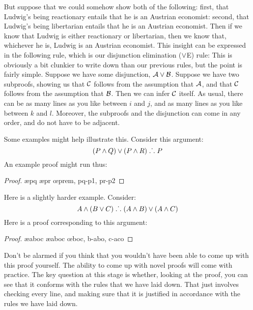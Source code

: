 But suppose that we could somehow show both of the following: first, that Ludwig's being reactionary entails that he is an Austrian economist: second, that Ludwig's being libertarian entails that he is an Austrian economist. Then if we know that Ludwig is either reactionary or libertarian, then we know that, whichever he is, Ludwig is an Austrian economist. This insight can be expressed in the following rule, which is our disjunction elimination ($\vee$E) rule:
This is obviously a bit clunkier to write down than our previous rules, but the point is fairly simple. Suppose we have some disjunction, $\mathcal{A} \vee \mathcal{B}$. Suppose we have two subproofs, showing us that $\mathcal{C}$ follows from the assumption that $\mathcal{A}$, and that $\mathcal{C}$ follows from the assumption that $\mathcal{B}$. Then we can infer $\mathcal{C}$ itself. As usual, there can be as many lines as you like between $i$ and $j$, and as many lines as you like between $k$ and $l$. Moreover, the subproofs and the disjunction can come in any order, and do not have to be adjacent.

Some examples might help illustrate this. Consider this argument:
$$(P \wedge Q) \vee (P \wedge R) \mathrel{\ldotp\dot{}\,\ldotp} P$$
An example proof might run thus:
	\begin{proof}
			\open
				\ae{pq}
			\close
			\open
				\ae{pr}
			\close
		\oe{prem, pq-p1, pr-p2}
	\end{proof}
Here is a slightly harder example. Consider:
	$$ A \wedge (B \vee C) \mathrel{\ldotp\dot{}\,\ldotp} (A \wedge B) \vee (A \wedge C)$$
Here is a proof corresponding to this argument:
	\begin{proof}
		\ae{aboc}
		\ae{aboc}
		\open
		\close
		\open
		\close
	\oe{boc, b-abo, c-aco}
	\end{proof}
Don't be alarmed if you think that you wouldn't have been able to come up with this proof yourself. The ability to come up with novel proofs will come with practice. The key question at this stage is whether, looking at the proof, you can see that it conforms with the rules that we have laid down. That just involves checking every line, and making sure that it is justified in accordance with the rules we have laid down.


